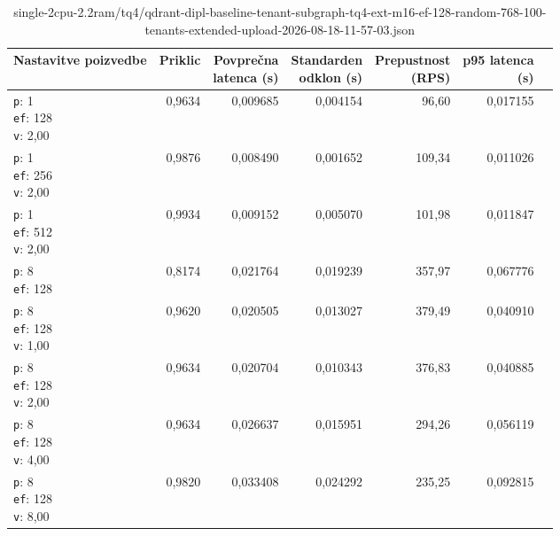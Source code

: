 \begin{table}[htbp]
  \centering
\small
  \caption{single-2cpu-2.2ram/tq4/qdrant-dipl-baseline-tenant-subgraph-tq4-ext-m16-ef-128-random-768-100-tenants-extended-upload-2026-08-18-11-57-03.json}
  \label{tab:single-2cpu-2.2ram:tq4:qdrant-dipl-baseline-tenant-subgraph-tq4-ext-m16-ef-128-random-768-100-tenants-extended-upload-2026-08-18-11-57-03.json}
  \begin{tabularx}{\textwidth}{Xrrrrrr}
    \toprule
    Nastavitve poizvedbe & Priklic & \makecell{Povprečna\\latenca (s)} & \makecell{Standarden\\odklon (s)} & \makecell{Prepustnost\\(RPS)} & \makecell{p95 latenca\\(s)}  \\
    \midrule
    \makecell{\texttt{p}: 1\\\texttt{ef}: 128\\\texttt{v}: 2,00} & 0,9634 & 0,009685 & 0,004154 & 96,60 & 0,017155 \\
    \makecell{\texttt{p}: 1\\\texttt{ef}: 256\\\texttt{v}: 2,00} & 0,9876 & 0,008490 & 0,001652 & 109,34 & 0,011026 \\
    \makecell{\texttt{p}: 1\\\texttt{ef}: 512\\\texttt{v}: 2,00} & 0,9934 & 0,009152 & 0,005070 & 101,98 & 0,011847 \\
    \makecell{\texttt{p}: 8\\\texttt{ef}: 128} & 0,8174 & 0,021764 & 0,019239 & 357,97 & 0,067776 \\
    \makecell{\texttt{p}: 8\\\texttt{ef}: 128\\\texttt{v}: 1,00} & 0,9620 & 0,020505 & 0,013027 & 379,49 & 0,040910 \\
    \makecell{\texttt{p}: 8\\\texttt{ef}: 128\\\texttt{v}: 2,00} & 0,9634 & 0,020704 & 0,010343 & 376,83 & 0,040885 \\
    \makecell{\texttt{p}: 8\\\texttt{ef}: 128\\\texttt{v}: 4,00} & 0,9634 & 0,026637 & 0,015951 & 294,26 & 0,056119 \\
    \makecell{\texttt{p}: 8\\\texttt{ef}: 128\\\texttt{v}: 8,00} & 0,9820 & 0,033408 & 0,024292 & 235,25 & 0,092815 \\

\end{tabularx}
\end{table}

